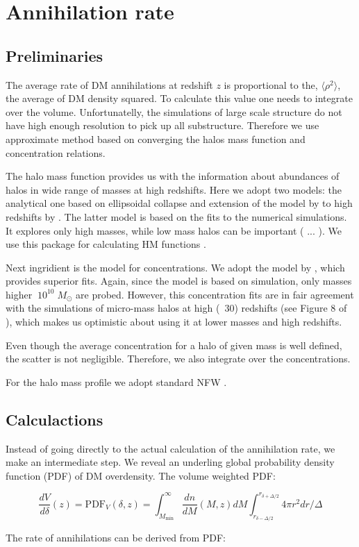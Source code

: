 \section{Annihilation rate}

\subsection{Preliminaries}

The average rate of DM annihilations at redshift $z$ is proportional to the, $\langle \rho^2 \rangle$, the average of DM density squared. To calculate this value one needs to integrate over the volume. Unfortunatelly, the simulations of large scale structure do not have high enough resolution to pick up all substructure. Therefore we use approximate method based on converging the halos mass function and concentration relations.

The halo mass function provides us with the information about abundances of halos in wide range of masses at high redshifts. Here we adopt two models: the analytical one based on ellipsoidal collapse \cite{Sheth_2001} and extension of the model by \cite{Tinker_2008} to high redshifts by \cite{Behroozi_2013}. The latter model is based on the fits to the numerical simulations. It explores only high masses, while low mass halos can be important ( ... ). We use this package for calculating HM functions \cite{Murray_2013}.

Next ingridient is the model for concentrations. We adopt the model by \cite{2014arXiv1407.4730D}, which provides superior fits. Again, since the model is based on simulation, only masses higher $~10^{10}\;M_\odot$ are probed. However, this concentration fits are in fair agreement with the simulations of micro-mass halos at high (~30) redshifts (see Figure 8 of \cite{2014arXiv1407.4730D}), which makes us optimistic about using it at lower masses and high redshifts.

Even though the average concentration for a halo of given mass is well defined, the scatter is not negligible. Therefore, we also integrate over the concentrations.

For the halo mass profile we adopt standard NFW \cite{1997ApJ...490..493N}. 

\subsection{Calculactions}
Instead of going directly to the actual calculation of the annihilation rate, we make an intermediate step. We reveal an underling global probability density function (PDF) of DM overdensity. The volume weighted PDF:

\begin{equation}
\dfrac{dV}{d\delta}(z)=\mathrm{PDF}_V (\delta, z) = \int_{M_\mathrm{min}}^\infty \dfrac{dn}{dM}(M,z) dM \int_{r_{\delta-\Delta/2}}^{r_{\delta+\Delta/2}} 4\pi r^2 dr / \Delta
\end{equation}

The rate of annihilations can be derived from PDF: